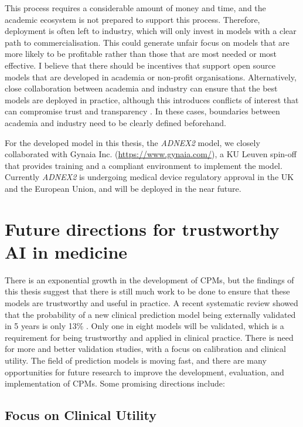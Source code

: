 This process requires a considerable amount of money and time, and the academic ecosystem is not prepared to support this process. Therefore, deployment is often left to industry, which will only invest in models with a clear path to commercialisation. This could generate unfair focus on models that are more likely to be profitable rather than those that are most needed or most effective. I believe that there should be incentives that support open source models that are developed in academia or non-profit organisations. Alternatively, close collaboration between academia and industry can ensure that the best models are deployed in practice, although this introduces conflicts of interest that can compromise trust and transparency \cite{pantanowitzRulesEngagementPromoting2022}. In these cases, boundaries between academia and industry need to be clearly defined beforehand.


For the developed model in this thesis, the \emph{ADNEX2} model, we closely collaborated with Gynaia Inc. (\url{https://www.gynaia.com/}), a KU Leuven spin-off that provides training and a compliant environment to implement the model. Currently \emph{ADNEX2} is undergoing medical device regulatory approval in the UK and the European Union, and will be deployed in the near future. 


\section{Future directions for trustworthy AI in medicine}

There is an exponential growth in the development of \glspl{CPM}, but the findings of this thesis suggest that there is still much work to be done to ensure that these models are trustworthy and useful in practice. A recent systematic review showed that the probability of a new clinical prediction model being externally validated in 5 years is only 13\% \cite{arshiNumberPublicationsNew2025}. Only one in eight models will be validated, which is a requirement for being trustworthy and applied in clinical practice. There is need for more and better validation studies, with a focus on calibration and clinical utility. The field of prediction models is moving fast, and there are many opportunities for future research to improve the development, evaluation, and implementation of \glspl{CPM}. Some promising directions include:

\subsection{Focus on Clinical Utility}

